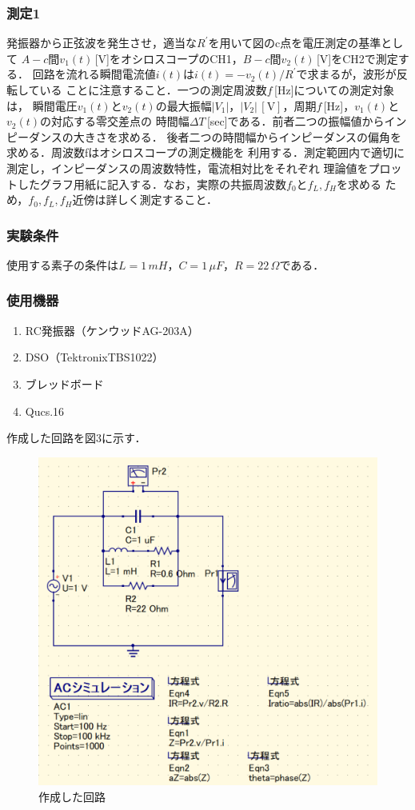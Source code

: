 \newpage

\subsubsection*{測定1}
発振器から正弦波を発生させ，適当な$R^{\prime}$を用いて図のc点を電圧測定の基準として
$A-c$間$v_1(t)$\,[V]をオシロスコープのCH1，$B-c$間$v_2(t)$\,[V]をCH2で測定する．
回路を流れる瞬間電流値$i(t)$は$i(t)= -v_2 (t)/R^{\prime}$で求まるが，波形が反転している
ことに注意すること．一つの測定周波数$f$\,[Hz]についての測定対象は，
瞬間電圧$v_1(t)$と$v_2(t)$の最大振幅$|V_1|$，$|V_2|\,[\si{\volt}]$，周期$f$\,[Hz]，$v_1(t)$と$v_2(t)$の対応する零交差点の
時間幅$ΔT$\,[sec]である．前者二つの振幅値からインピーダンスの大きさを求める．
後者二つの時間幅からインピーダンスの偏角を求める．周波数fはオシロスコープの測定機能を
利用する．測定範囲内で適切に測定し，インピーダンスの周波数特性，電流相対比をそれぞれ
理論値をプロットしたグラフ用紙に記入する．なお，実際の共振周波数$f_0$と$f_L,f_H$を求める
ため，$f_0,f_L,f_H$近傍は詳しく測定すること．

\subsubsection*{実験条件}
使用する素子の条件は$L = 1\,\si{mH}，C = 1\,\si{\mu F}，R = 22\,\si{\Omega}$である．

\subsubsection*{使用機器}
\begin{enumerate}
    \item RC発振器（ケンウッド\quad AG-203A）
    \item DSO（Tektronix\quad TBS1022）
    \item ブレッドボード
    \item Qucs.16
\end{enumerate}

作成した回路を図3に示す．

\begin{figure}[H]
    \begin{center}
        \includegraphics[scale=0.45]{figure3.pdf}
        \caption{作成した回路}
    \end{center}
\end{figure}